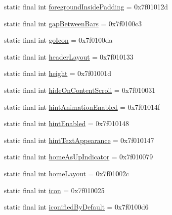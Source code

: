 \begin{CompactItemize}
\item 
static final int \hyperlink{classandroid_1_1support_1_1v7_1_1recyclerview_1_1_r_1_1attr_5546f4abc9888aefb3dc13c33572d0a8}{foregroundInsidePadding} = 0x7f01012d
\item 
static final int \hyperlink{classandroid_1_1support_1_1v7_1_1recyclerview_1_1_r_1_1attr_b052be03c5a0c3e67be6babace94cb4a}{gapBetweenBars} = 0x7f0100c3
\item 
static final int \hyperlink{classandroid_1_1support_1_1v7_1_1recyclerview_1_1_r_1_1attr_5a1658b0a2067c34be513f446b828955}{goIcon} = 0x7f0100da
\item 
static final int \hyperlink{classandroid_1_1support_1_1v7_1_1recyclerview_1_1_r_1_1attr_2616921fcda3ce720d21d0744ed0dba7}{headerLayout} = 0x7f010133
\item 
static final int \hyperlink{classandroid_1_1support_1_1v7_1_1recyclerview_1_1_r_1_1attr_c5149cbf710128c8a3edb8daf63a57cd}{height} = 0x7f01001d
\item 
static final int \hyperlink{classandroid_1_1support_1_1v7_1_1recyclerview_1_1_r_1_1attr_eee8275b0b928b90e7fde15fa413959c}{hideOnContentScroll} = 0x7f010031
\item 
static final int \hyperlink{classandroid_1_1support_1_1v7_1_1recyclerview_1_1_r_1_1attr_d99f0f1b7dcfa5d0fe951d7cead18ca4}{hintAnimationEnabled} = 0x7f01014f
\item 
static final int \hyperlink{classandroid_1_1support_1_1v7_1_1recyclerview_1_1_r_1_1attr_1da334e4ee8db533cb44cae6e6deddb3}{hintEnabled} = 0x7f010148
\item 
static final int \hyperlink{classandroid_1_1support_1_1v7_1_1recyclerview_1_1_r_1_1attr_15e3b04c6e5b26e27da51758beaa0579}{hintTextAppearance} = 0x7f010147
\item 
static final int \hyperlink{classandroid_1_1support_1_1v7_1_1recyclerview_1_1_r_1_1attr_b32832af03911966ed40e4bf3d8b3cd2}{homeAsUpIndicator} = 0x7f010079
\item 
static final int \hyperlink{classandroid_1_1support_1_1v7_1_1recyclerview_1_1_r_1_1attr_54b21ca2f53c34836753d5276dbc5dff}{homeLayout} = 0x7f01002c
\item 
static final int \hyperlink{classandroid_1_1support_1_1v7_1_1recyclerview_1_1_r_1_1attr_837775e9bcb8d997ad384926175dbaa7}{icon} = 0x7f010025
\item 
static final int \hyperlink{classandroid_1_1support_1_1v7_1_1recyclerview_1_1_r_1_1attr_455008e854cc92bf685b28d87db05008}{iconifiedByDefault} = 0x7f0100d6
\item 

\end{CompactItemize}
